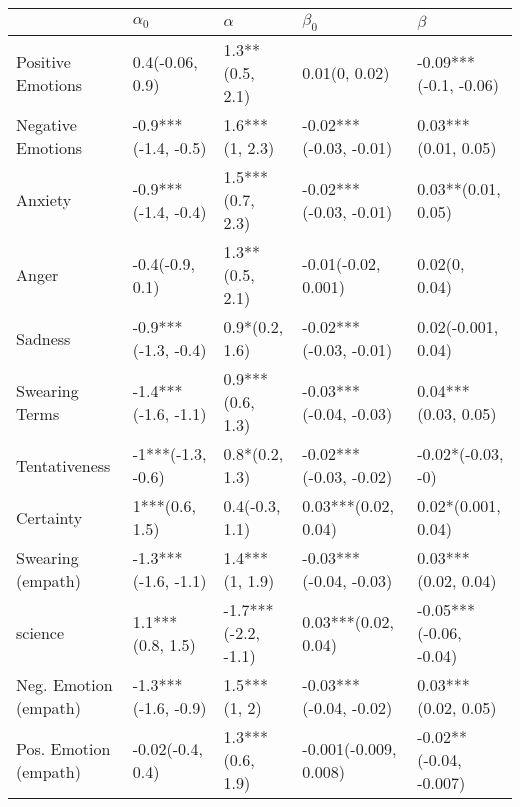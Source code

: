 \begin{tabular}{lllll}
\toprule
{} &           $\alpha_0$ &             $\alpha$ &               $\beta_0$ &                 $\beta$ \\
\midrule
Positive Emotions     &      0.4(-0.06, 0.9) &      1.3**(0.5, 2.1) &           0.01(0, 0.02) &   -0.09***(-0.1, -0.06) \\
Negative Emotions     &  -0.9***(-1.4, -0.5) &       1.6***(1, 2.3) &  -0.02***(-0.03, -0.01) &     0.03***(0.01, 0.05) \\
Anxiety               &  -0.9***(-1.4, -0.4) &     1.5***(0.7, 2.3) &  -0.02***(-0.03, -0.01) &      0.03**(0.01, 0.05) \\
Anger                 &      -0.4(-0.9, 0.1) &      1.3**(0.5, 2.1) &     -0.01(-0.02, 0.001) &           0.02(0, 0.04) \\
Sadness               &  -0.9***(-1.3, -0.4) &       0.9*(0.2, 1.6) &  -0.02***(-0.03, -0.01) &      0.02(-0.001, 0.04) \\
Swearing Terms        &  -1.4***(-1.6, -1.1) &     0.9***(0.6, 1.3) &  -0.03***(-0.04, -0.03) &     0.04***(0.03, 0.05) \\
Tentativeness         &    -1***(-1.3, -0.6) &       0.8*(0.2, 1.3) &  -0.02***(-0.03, -0.02) &       -0.02*(-0.03, -0) \\
Certainty             &       1***(0.6, 1.5) &       0.4(-0.3, 1.1) &     0.03***(0.02, 0.04) &      0.02*(0.001, 0.04) \\
Swearing (empath)     &  -1.3***(-1.6, -1.1) &       1.4***(1, 1.9) &  -0.03***(-0.04, -0.03) &     0.03***(0.02, 0.04) \\
science               &     1.1***(0.8, 1.5) &  -1.7***(-2.2, -1.1) &     0.03***(0.02, 0.04) &  -0.05***(-0.06, -0.04) \\
Neg. Emotion (empath) &  -1.3***(-1.6, -0.9) &         1.5***(1, 2) &  -0.03***(-0.04, -0.02) &     0.03***(0.02, 0.05) \\
Pos. Emotion (empath) &     -0.02(-0.4, 0.4) &     1.3***(0.6, 1.9) &   -0.001(-0.009, 0.008) &  -0.02**(-0.04, -0.007) \\
\bottomrule
\end{tabular}
